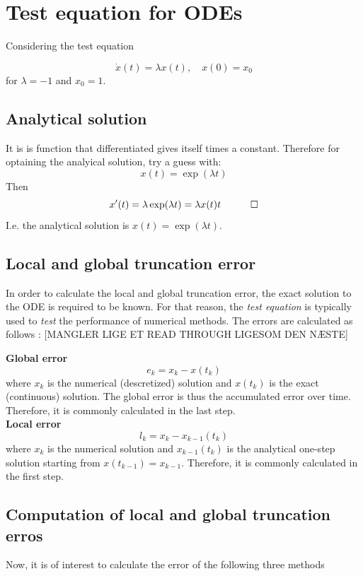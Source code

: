 \section{Test equation for ODEs}
Considering the test equation

$$
\dot{x}(t)=\lambda x(t), \quad x(0)=x_{0} \label{eq:test}
$$
for $\lambda=-1$ and $x_{0}=1$.

\subsection{Analytical solution}
It is is function that differentiated gives itself times a constant. Therefore for optaining the analyical solution, try a guess with:
$$
x(t) = \exp(\lambda t)
$$
Then
$$
x'(t) = \lambda \exp(\lambda t) = \lambda x(t)t  \quad \qed
$$
I.e. the analytical solution is $x(t) = \exp(\lambda t)$.

\subsection{Local and global truncation error}
In order to calculate the local and global truncation error, the exact solution to the ODE is required to be known. For that reason, the \textit{test equation} is typically used to \textit{test} the performance of numerical methods. The errors are calculated as follows \cite{JrgensenScientificEquations}:
[MANGLER LIGE ET READ THROUGH LIGESOM DEN NÆSTE]

\textbf{Global error}
$$
e_{k}=x_{k}-x\left(t_{k}\right)
$$
where $x_{k}$ is the numerical (descretized) solution and $x\left(t_{k}\right)$ is the exact (continuous) solution. The global error is thus the accumulated error over time. Therefore, it is commonly calculated in the last step.
\\

\textbf{Local error}
$$
l_{k}=x_{k}-x_{k-1}\left(t_{k}\right)
$$
where $x_{k}$ is the numerical solution and $x_{k-1}\left(t_{k}\right)$ is the analytical one-step solution starting from $x\left(t_{k-1}\right)=x_{k-1}$. Therefore, it is commonly calculated in the first step.
\\

\subsection{Computation of local and global truncation erros}

Now, it is of interest to calculate the error of the following three methods
\\

